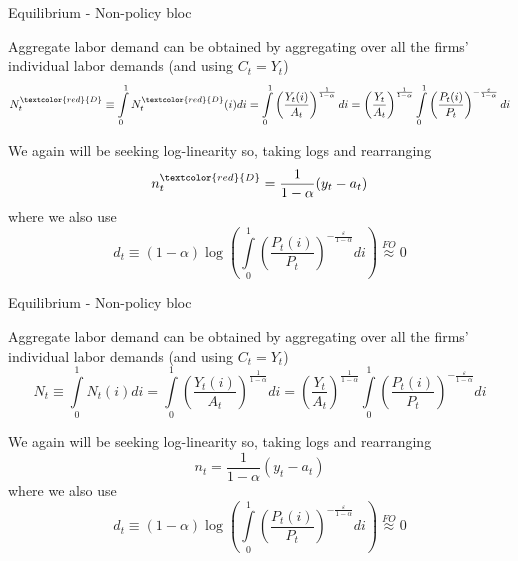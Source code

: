 \documentclass{beamer}
\begin{document}
	
\begin{frame}{Equilibrium - Non-policy bloc}

Aggregate labor demand can be obtained by aggregating over all the firms' individual labor demands (and using $C_{t}=Y_{t}$)
\[
N^{\textcolor{red}{D}}_{t} \equiv \int\limits_{0}^{1} N^{\textcolor{red}{D}}_{t}(i) di = \int\limits_{0}^{1} \left( \frac{Y_{t}(i)}{A_{t}} \right)^{\frac{1}{1-\alpha}} di = \left( \frac{Y_{t}}{A_{t}} \right)^{\frac{1}{1-\alpha}} \int\limits_{0}^{1} \left( \frac{P_{t}(i)}{P_{t}} \right)^{-\frac{\varepsilon}{1-\alpha}}di
\]

We again will be seeking log-linearity so, taking logs and rearranging
\[
n_{t}^{\textcolor{red}{D}} = \frac{1}{1-\alpha}(y_{t} - a_{t})
\]
where we also use
\[
d_{t}\equiv (1-\alpha)\log{\left(  \int\limits_{0}^{1} \left( \frac{P_{t}(i)}{P_{t}} \right)^{-\frac{\varepsilon}{1-\alpha}}di \right)} \stackrel{FO}{\approx} 0
\]

\end{frame}


	
\begin{frame}{Equilibrium - Non-policy bloc}

Aggregate labor demand can be obtained by aggregating over all the firms' individual labor demands (and using $C_{t}=Y_{t}$)
\[
N_{t} \equiv \int\limits_{0}^{1} N_{t}(i) di = \int\limits_{0}^{1} \left( \frac{Y_{t}(i)}{A_{t}} \right)^{\frac{1}{1-\alpha}} di = \left( \frac{Y_{t}}{A_{t}} \right)^{\frac{1}{1-\alpha}} \int\limits_{0}^{1} \left( \frac{P_{t}(i)}{P_{t}} \right)^{-\frac{\varepsilon}{1-\alpha}}di
\]

We again will be seeking log-linearity so, taking logs and rearranging
\[
n_{t} = \frac{1}{1-\alpha}(y_{t} - a_{t})
\]
where we also use
\[
d_{t}\equiv (1-\alpha)\log{\left(  \int\limits_{0}^{1} \left( \frac{P_{t}(i)}{P_{t}} \right)^{-\frac{\varepsilon}{1-\alpha}}di \right)} \stackrel{FO}{\approx} 0
\]

\hyperlink{jumpback}{}

\end{frame}
\end{document}
